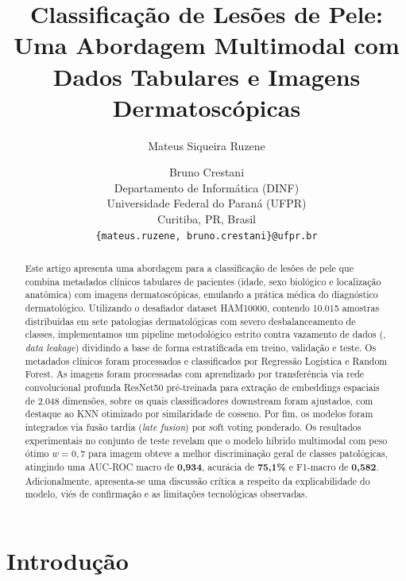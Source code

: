 \documentclass[10pt,twocolumn,letterpaper]{article}
\begin{document}
\title{Classificação de Lesões de Pele: Uma Abordagem Multimodal com Dados Tabulares e Imagens Dermatoscópicas}

\author{Mateus Siqueira Ruzene \and Bruno Crestani\\
Departamento de Informática (DINF)\\
Universidade Federal do Paraná (UFPR)\\
Curitiba, PR, Brasil\\
{\tt\small \{mateus.ruzene, bruno.crestani\}@ufpr.br}
}
\maketitle

\begin{abstract}
   Este artigo apresenta uma abordagem para a classificação de lesões de pele que combina metadados clínicos tabulares de pacientes (idade, sexo biológico e localização anatômica) com imagens dermatoscópicas, emulando a prática médica do diagnóstico dermatológico. Utilizando o desafiador dataset HAM10000, contendo 10.015 amostras distribuídas em sete patologias dermatológicas com severo desbalanceamento de classes, implementamos um pipeline metodológico estrito contra vazamento de dados (\eg, \emph{data leakage}) dividindo a base de forma estratificada em treino, validação e teste. Os metadados clínicos foram processados e classificados por Regressão Logística e Random Forest. As imagens foram processadas com aprendizado por transferência via rede convolucional profunda ResNet50 pré-treinada para extração de embeddings espaciais de 2.048 dimensões, sobre os quais classificadores downstream foram ajustados, com destaque ao KNN otimizado por similaridade de cosseno. Por fim, os modelos foram integrados via fusão tardia (\emph{late fusion}) por soft voting ponderado. Os resultados experimentais no conjunto de teste revelam que o modelo híbrido multimodal com peso ótimo $w=0,7$ para imagem obteve a melhor discriminação geral de classes patológicas, atingindo uma AUC-ROC macro de \textbf{0,934}, acurácia de \textbf{75,1\%} e F1-macro de \textbf{0,582}. Adicionalmente, apresenta-se uma discussão crítica a respeito da explicabilidade do modelo, viés de confirmação e as limitações tecnológicas observadas.
\end{abstract}

\section{Introdução}
\label{sec:intro}
\end{document}
